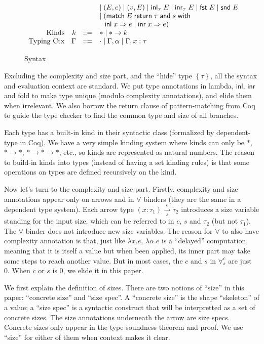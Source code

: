 \documentclass[preprint]{sigplanconf}
\newcommand{\thide}[1]{\left \{ #1 \right \}}
\newcommand{\arrow}[4]{#1\xrightarrow[#3]{#2}#4}
\newcommand{\symand}{\mathsf{\;and\;}}
\newcommand{\symmatch}{\mathsf{match}}
\newcommand{\symwith}{\mathsf{\;with\;}}
\newcommand{\symreturn}{\mathsf{\;return\;}}
\newcommand{\syminl}{\mathsf{inl}}
\newcommand{\syminr}{\mathsf{inr}}
\newcommand{\intro}[2]{(#1 : #2)}
\newcommand{\symfst}{\mathsf{fst}}
\newcommand{\symsnd}{\mathsf{snd}}
\begin{document}
\begin{figure}
$$\begin{array}{rrcl}
  & & & \mid (E, e) \mid (v, E) \mid \syminl_\tau\;E \mid \syminr_\tau\;E \mid \symfst\;E \mid \symsnd\;E \\
  & & & \mid (\symmatch\;E\symreturn \tau \symand s \symwith \\
  & & & \hspace{.1in} \syminl\;x\Rightarrow e\;|\;\syminr\;x\Rightarrow e) \\
  \textrm{Kinds} & k &::=& * \mid *\to k \\
  \textrm{Typing Ctx} & \Gamma &::=& \cdot \mid \Gamma,\alpha \mid \Gamma, x:\tau
\end{array}$$
\caption{\label{syntax}Syntax}
\end{figure}

Excluding the complexity and size part, and the ``hide'' type $\thide{\tau}$, all the syntax and evaluation context are standard. We put type annotations in lambda, $\syminl$, $\syminr$ and fold to make type unique (modulo complexity annotations), and elide them when irrelevant. We also borrow the return clause of pattern-matching from Coq to guide the type checker to find the common type and size of all branches. 

Each type has a built-in kind in their syntactic class (formalized by dependent-type in Coq). We have a very simple kinding system where kinds can only be $*$, $*\to *$, $*\to *\to *$, etc., so kinds are represented as natural numbers. The reason to build-in kinds into types (instead of having a set kinding rules) is that some operations on types are defined recursively on the kind.

Now let's turn to the complexity and size part. Firstly, complexity and size annotations appear only on arrows and in $\forall$ binders (they are the same in a dependent type system). Each arrow type $\arrow{\intro{x}{\tau_1}}{c}{s}{\tau_2}$ introduces a size variable standing for the input size, which can be referred to in $c$, $s$ and $\tau_2$ (but not $\tau_1$). The $\forall$ binder does not introduce new size variables. The reason for $\forall$ to also have complexity annotation is that, just like $\lambda x.e$, $\lambda \alpha.e$ is a ``delayed'' computation, meaning that it is itself a value but when been applied, its inner part may take some steps to reach another value. But in most cases, the $c$ and $s$ in $\forall^c_s$ are just 0. When $c$ or $s$ is 0, we elide it in this paper.

We first explain the definition of sizes. There are two notions of ``size'' in this paper: ``concrete size'' and ``size spec''. A ``concrete size'' is the shape ``skeleton'' of a value; a ``size spec'' is a syntactic construct that will be interpretted as a set of concrete sizes. The size annotations underneath the arrow are size specs. Concrete sizes only appear in the type soundness theorem and proof. We use ``size'' for either of them when context makes it clear.
\end{document}
